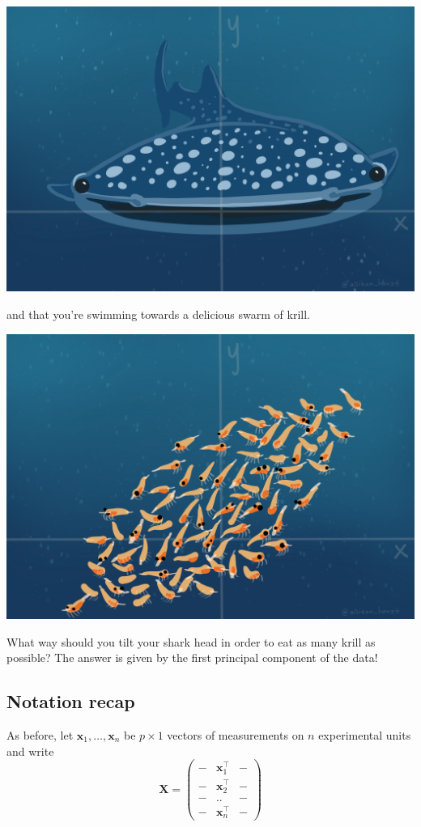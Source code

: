 \documentclass[]{book}
\theoremstyle{definition}
\theoremstyle{definition}
\theoremstyle{definition}
\theoremstyle{remark}
\begin{document}
\includegraphics{figs/WideMouthShark1.png}

and that you're swimming towards a delicious swarm of krill.

\includegraphics{figs/WideMouthShark2.png}

What way should you tilt your shark head in order to eat as many krill as possible? The answer is given by the first principal component of the data!

\hypertarget{notation-recap}{%
\subsection{Notation recap}\label{notation-recap}}

As before, let \(\boldsymbol x_1,\ldots,\boldsymbol x_n\) be \(p \times 1\) vectors of measurements on \(n\) experimental units and write
\[\boldsymbol X=\left( \begin{array}{ccc}
- &\boldsymbol x_1^\top&-\\
- &\boldsymbol x_2^\top&-\\
- &..&-\\
- &\boldsymbol x_n^\top&-
\end{array}\right)
\]
\end{document}
